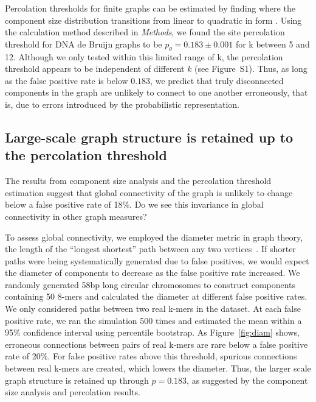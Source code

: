 \documentclass{pnastwo}
\begin{document}
\begin{article}

Percolation thresholds for finite graphs can be estimated by finding
where the component size distribution transitions from linear to
quadratic in form \cite{stauffer1979scaling}.  Using the calculation
method described in \emph{Methods}, we found the site percolation
threshold for DNA de Bruijn graphs to be $p_\theta = 0.183 \pm 0.001$
for k between 5 and 12.
Although we only tested within this limited range of k, the
percolation threshold appears to be independent of different $k$ (see
Figure~S1).
Thus, as long as the false positive rate is below $0.183$, we
predict that truly disconnected components in the graph are unlikely
to connect to one another erroneously, that is, due to errors
introduced by the probabilistic representation.

\subsection{Large-scale graph structure is retained up to the percolation threshold}

The results from component size analysis and the percolation threshold
estimation suggest that global connectivity of the graph is unlikely
to change below a false positive rate of 18\%.  Do we see this invariance
in global connectivity in other graph measures?

To assess global connectivity, we employed the diameter metric in
graph theory, the length of the ``longest shortest'' path between any two
vertices~\cite{bondy2008graph}.  If shorter paths were being systematically
generated due to false positives, we would expect the diameter of components to
decrease as the false positive rate increased.
We randomly generated 58bp
long circular chromosomes to construct components containing 50 8-mers
and calculated the diameter at different false positive rates. 
We only considered paths
between two real k-mers in the dataset.  
At each
false positive rate, we ran the simulation 500 times and estimated the
mean within a 95\% confidence interval using percentile bootstrap. As
Figure~\ref{fig:diam} shows, erroneous connections between pairs of
real k-mers are rare below a false positive rate of 20\%.
For false positive rates above this threshold, spurious
connections between real k-mers are created, which lowers the
diameter.  Thus, the larger scale graph structure is retained up through
$p = 0.183$, as suggested by the component size analysis and
percolation results.


\end{article}
\end{document}
